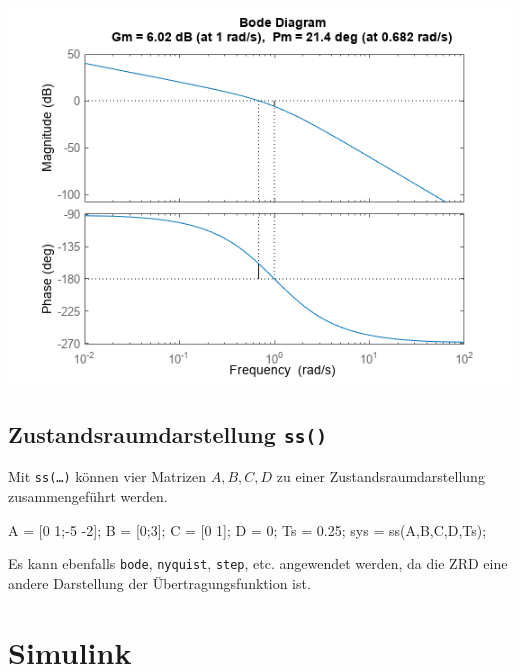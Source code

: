 \documentclass[
  10pt,
  a4paper,
  german]{article}
\newenvironment{Shaded}{}{}
\newcommand{\FloatTok}[1]{\textcolor[rgb]{0.00,0.36,0.77}{#1}}
\newcommand{\NormalTok}[1]{\textcolor[rgb]{0.14,0.16,0.18}{#1}}
\newcommand{\OperatorTok}[1]{\textcolor[rgb]{0.14,0.16,0.18}{#1}}
\newcommand{\VariableTok}[1]{\textcolor[rgb]{0.89,0.38,0.04}{#1}}
\numberwithin{equation}{section}
\begin{document}
\begin{multicols}{2}
\includegraphics{images/PlotGainAndPhaseMarginsOfTransferFunctionExample_01.png}

\hypertarget{zustandsraumdarstellung-ss}{%
\subsection{\texorpdfstring{Zustandsraumdarstellung
\texttt{ss()}}{Zustandsraumdarstellung ss()}}\label{zustandsraumdarstellung-ss}}

Mit \texttt{ss(…)} können vier Matrizen \(A, B,C,D\) zu einer
Zustandsraumdarstellung zusammengeführt werden.

\begin{Shaded}
\begin{Highlighting}[]
\VariableTok{A} \OperatorTok{=}\NormalTok{ [}\FloatTok{0} \FloatTok{1}\OperatorTok{;{-}}\FloatTok{5} \OperatorTok{{-}}\FloatTok{2}\NormalTok{]}\OperatorTok{;}
\VariableTok{B} \OperatorTok{=}\NormalTok{ [}\FloatTok{0}\OperatorTok{;}\FloatTok{3}\NormalTok{]}\OperatorTok{;}
\VariableTok{C} \OperatorTok{=}\NormalTok{ [}\FloatTok{0} \FloatTok{1}\NormalTok{]}\OperatorTok{;}
\VariableTok{D} \OperatorTok{=} \FloatTok{0}\OperatorTok{;}
\VariableTok{Ts} \OperatorTok{=} \FloatTok{0.25}\OperatorTok{;}
\VariableTok{sys} \OperatorTok{=} \VariableTok{ss}\NormalTok{(}\VariableTok{A}\OperatorTok{,}\VariableTok{B}\OperatorTok{,}\VariableTok{C}\OperatorTok{,}\VariableTok{D}\OperatorTok{,}\VariableTok{Ts}\NormalTok{)}\OperatorTok{;}
\end{Highlighting}
\end{Shaded}

Es kann ebenfalls \texttt{bode}, \texttt{nyquist}, \texttt{step}, etc.
angewendet werden, da die ZRD eine andere Darstellung der
Übertragungsfunktion ist.

\hypertarget{simulink}{%
\section{Simulink}\label{simulink}}

\end{multicols}
\end{document}
